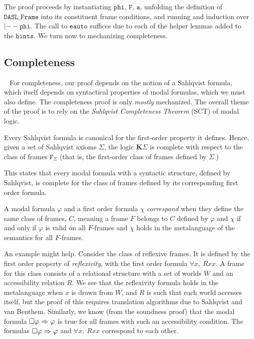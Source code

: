 The proof proceeds by instantiating $\mathtt{phi}$, $\mathtt{F}$, $\mathtt{a}$, unfolding the definition of $\mathtt{DASL\_Frame}$ into its constituent frame conditions, and running and induction over $\mathtt{|-- phi}$. The call to $\mathtt{eauto}$ suffices due to each of the helper lemmas added to the $\mathtt{hints}$. We turn now to mechanizing completeness.

\subsection{Completeness}~\label{sec:completeness}
For completeness, our proof depends on the notion of a Sahlqvist formula, which itself depends on syntactical properties of modal formulas, which we must also define. The completeness proof is only \emph{mostly} mechanized. The overall theme of the proof is to rely on the \emph{Sahlqvist Completeness Theorem} (SCT) of modal logic. 

\begin{theorem}
	Every Sahlqvist formula is canonical for the first-order property it defines. Hence, given a set of Sahlqvist axioms $\Sigma$, the logic $\mathbf{K}\Sigma$ is complete with respect to the class of frames $\mathtt{F}_\Sigma$ (that is, the first-order class of frames defined by $\Sigma$.)
\end{theorem}

This states that every modal formula with a syntactic structure, defined by Sahlqvist, is complete for the class of frames defined by its corresponding first order formula. 

A modal formula $\varphi$ and a first order formula $\chi$ \emph{correspond} when they define the same class of frames, $C$, meaning a frame $F$ belongs to $C$ defined by  $\varphi$ and $\chi$ if and only if $\varphi$ is valid on all $F$-frames and $\chi$ holds in the metalanguage of the semantics for all $F$-frames.

An example might help. Consider the class of reflexive frames. It is defined by the first order property of \emph{reflexivity}, with the first order formula $\forall x,\ Rxx$. A frame for this class consists of a relational structure with a set of worlds $W$ and an accessibility relation $R$. We see that the reflexivity formula holds in the metalanguage when $x$ is drawn from $W$, and $R$ is such that each world accesses itself, but the proof of this requires translation algorithms due to Sahlqvist and van Benthem\cite{modal}. Similarly, we know (from the soundness proof) that the modal formula $\Box\varphi {\ \Rightarrow \ } \varphi$ is true for all frames with such an accessibility condition. The formulas $\Box\varphi {\ \Rightarrow \ } \varphi$ and $\forall x,\ Rxx$ correspond to each other.

